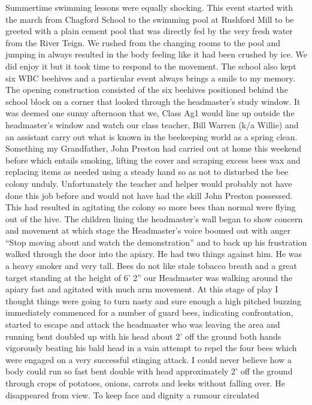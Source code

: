 Summertime swimming lessons were equally shocking.  This event started with the
march from Chagford School to the swimming pool at Rushford Mill to be greeted
with a plain cement pool that was directly fed by the very fresh water from the
River Teign.  We rushed from the changing rooms to the pool and jumping in
always resulted in the body feeling like it had been crushed by ice.  We did
enjoy it but it took time to respond to the movement. The school also kept six
WBC beehives and a particular event always brings a smile to my memory.  The
opening construction consisted of the six beehives positioned behind the school
block on a corner that looked through the headmaster's study window. It was
deemed one sunny afternoon that we, Class Ag1 would line up outside the
headmaster's window and watch our class teacher, Bill Warren (k/a Willie) and
an assistant carry out what is known in the beekeeping world as a spring clean.
Something my Grandfather, John Preston had carried out at home this weekend
before which entails smoking, lifting the cover and scraping excess bees wax
and replacing items as needed using a steady hand so as not to disturbed the
bee colony unduly.  Unfortunately the teacher and helper would probably not
have done this job before and would not have had the skill John Preston
possessed.  This had resulted in agitating the colony so more bees than normal
were flying out of the hive. The children lining the headmaster's wall began to
show concern and movement at which stage the Headmaster's voice boomed out with
anger ``Stop moving about and watch the demonstration'' and to back up his
frustration walked through the door into the apiary.  He had two things against
him.  He was a heavy smoker and very tall. Bees do not like stale tobacco
breath and a great target standing at the height of 6' 2'' our Headmaster was
walking around the apiary fast and agitated with much arm movement.  At this
stage of play I thought things were going to turn nasty and sure enough a high
pitched buzzing immediately commenced for a number of guard bees, indicating
confrontation, started to escape and attack the headmaster who was leaving the
area and running bent doubled up with his head about 2' off the ground both
hands vigorously beating his bald head in a vain attempt to repel the four bees
which were engaged on a very successful stinging attack.  I could never believe
how a body could run so fast bent double with head approximately  2' off the
ground through crops of potatoes, onions, carrots and leeks without falling
over.  He disappeared from view.  To keep face and dignity a rumour circulated
